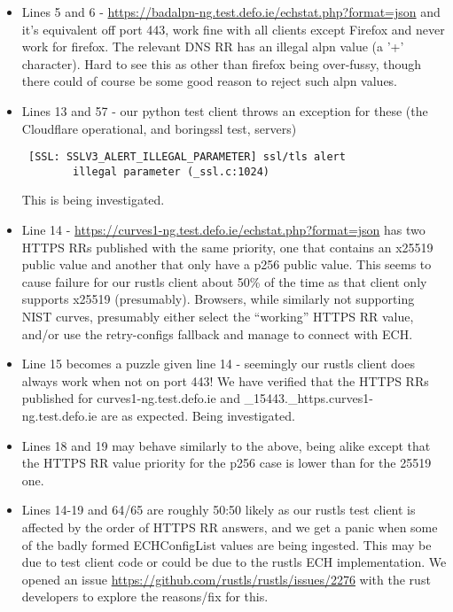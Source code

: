 \begin{itemize}

    \item Lines 5 and 6 -
        \url{https://badalpn-ng.test.defo.ie/echstat.php?format=json} and it's
        equivalent off port 443, work fine with all clients except Firefox and
        never work for firefox. The relevant DNS RR has an illegal alpn value
        (a '+' character). Hard to see this as other than firefox being
        over-fussy, though there could of course be some good reason to reject
        such alpn values.

    \item Lines 13 and 57 - our python test client throws an exception for
        these (the Cloudflare operational, and boringssl test, servers)
        \begin{verbatim} [SSL: SSLV3_ALERT_ILLEGAL_PARAMETER] ssl/tls alert
        illegal parameter (_ssl.c:1024) \end{verbatim} This is being
        investigated.

    \item Line 14 -
        \url{https://curves1-ng.test.defo.ie/echstat.php?format=json} has two
        HTTPS RRs published with the same priority, one that contains an x25519
        public value and another that only have a p256 public value. This seems
        to cause failure for our rustls client about 50\% of the time as that
        client only supports x25519 (presumably). Browsers, while similarly not
        supporting NIST curves, presumably either select the ``working'' HTTPS
        RR value, and/or use the retry-configs fallback and manage to connect
        with ECH.

    \item Line 15 becomes a puzzle given line 14 - seemingly our rustls client
        does always work when not on port 443! We have verified that the HTTPS
        RRs published for curves1-ng.test.defo.ie and
        \_15443.\_https.curves1-ng.test.defo.ie are as expected. Being
        investigated.

    \item Lines 18 and 19 may behave similarly to the above, being alike except
        that the HTTPS RR value priority for the p256 case is lower than for
        the 25519 one.

    \item Lines 14-19 and 64/65 are roughly 50:50 likely as our rustls test
        client is affected by the order of HTTPS RR answers, and we get a panic
        when some of the badly formed ECHConfigList values are being ingested.
        This may be due to test client code or could be due to the rustls ECH
        implementation. We opened an issue
        \url{https://github.com/rustls/rustls/issues/2276} with the rust
        developers to explore the reasons/fix for this.


\end{itemize}
